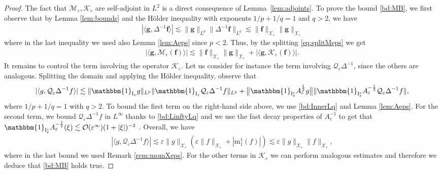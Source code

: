 \documentclass[11pt,reqno,a4paper]{amsart}
\def\eps{\varepsilon}
\newcommand{\cK}{\mathcal{K}}
\newcommand{\cM}{\mathcal{M}}
\newcommand{\cO}{\mathcal{O}}
\newcommand{\cQ}{\mathcal{Q}}
\newcommand{\cX}{\mathcal{X}}
\newcommand{\mrm}{\mathrm{m}}
\newcommand{\1}{\mathbbm{1}}
\theoremstyle{definition}
\theoremstyle{definition}
\numberwithin{equation}{section}
\begin{document}
\begin{proof}
    The fact that $\cM_{\eps},\cK_{\eps}$ are self-adjoint in $L^2$  is a direct consequence of Lemma~\ref{lem:adjoints}. To prove the bound \cref{bd:MB}, we first observe that by Lemma \ref{lem:bounds} and the H\"older inequality with exponents $1/p+1/q=1$ and $q>2$, we have 
    \begin{align}
        |\langle {\mathbf g},\Delta^{-1}{\mathbf f}\rangle|\lesssim \|{\mathbf g}\|_{L^p}\|\Delta^{-1}{\mathbf f}\|_{L^q}\lesssim\|{\mathbf f}\|_{\boldsymbol{\cX}_\eps}\|{\mathbf g}\|_{\boldsymbol{\cX}_\eps} 
    \end{align}
    where in the last inequality we used also Lemma \ref{lem:Aeps} since $p<2$. Thus, by the splitting \cref{eq:splitMeps} we get 
  \begin{align}
  |\langle {\mathbf g},\cM_{\eps}({\mathbf f})\rangle|\lesssim \|{\mathbf f}\|_{\boldsymbol{\cX}_\eps}\|{\mathbf g}\|_{\boldsymbol{\cX}_\eps}+|\langle {\mathbf g},\cK_{\eps}({\mathbf f})\rangle|.
\end{align}
It remains to control the term involving the operator $\cK_{\eps}$.  Let us consider for instance the term involving $\cQ_{\eps}\Delta^{-1}$, since the others are analogous. Splitting the domain and applying the H\"older inequality, observe that 
\begin{align}
    |\langle g,\cQ_{\eps}\Delta^{-1}f\rangle|\lesssim \|\mathbbm{1}_{{\rm I}_\eps}g\|_{L^p}\|\mathbbm{1}_{{\rm I}_\eps}\cQ_{\eps}\Delta^{-1}f\|_{L^q}+\big\|\mathbbm{1}_{{\rm I}^c_\eps}A^{\frac12}_\eps g\big\|\|\mathbbm{1}_{{\rm I}_\eps^c}A^{-\frac12}_\eps\cQ_{\eps}\Delta^{-1}f\|,\end{align}
    where $1/p+1/q=1$ with $q>2$.
    To bound the first term on the right-hand side above, we use \cref{bd:InnerLq} and Lemma \ref{lem:Aeps}. For the second term, we bound $\cQ_{\eps}\Delta^{-1}f$ in $L^\infty$ thanks to \cref{bd:LinftyLq} and we use the fast decay properties of $A_{\eps}^{-1}$ to get that $\mathbbm{1}_{{\rm I}_\eps^c}A_{\eps}^{-\frac12}(\xi)\lesssim \cO(\eps^\infty)(1+|\xi|)^{-2}$ . Overall, we have  
\begin{align}
    |\langle g,\cQ_{\eps}\Delta^{-1}f\rangle|\lesssim \eps\|g\|_{\cX_\eps}(\eps\|f\|_{\cX_\eps}+|\mrm^1_1(f)|)\lesssim \eps\|g\|_{\cX_\eps}\|f\|_{\cX_\eps},
    \end{align}
    where in the last bound we used Remark \ref{rem:momXeps}.
    For the other terms in $\cK_\eps$ we can perform analogous estimates and therefore we deduce that \cref{bd:MB} holds true.

\end{proof}
\end{document}
